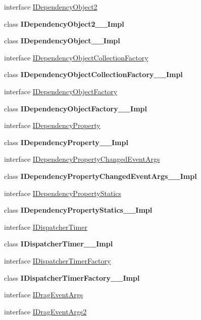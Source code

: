\begin{DoxyCompactItemize}
\item 
interface \hyperlink{interface_windows_1_1_u_i_1_1_xaml_1_1_i_dependency_object2}{I\+Dependency\+Object2}
\item 
class {\bfseries I\+Dependency\+Object2\+\_\+\+\_\+\+Impl}
\item 
class {\bfseries I\+Dependency\+Object\+\_\+\+\_\+\+Impl}
\item 
interface \hyperlink{interface_windows_1_1_u_i_1_1_xaml_1_1_i_dependency_object_collection_factory}{I\+Dependency\+Object\+Collection\+Factory}
\item 
class {\bfseries I\+Dependency\+Object\+Collection\+Factory\+\_\+\+\_\+\+Impl}
\item 
interface \hyperlink{interface_windows_1_1_u_i_1_1_xaml_1_1_i_dependency_object_factory}{I\+Dependency\+Object\+Factory}
\item 
class {\bfseries I\+Dependency\+Object\+Factory\+\_\+\+\_\+\+Impl}
\item 
interface \hyperlink{interface_windows_1_1_u_i_1_1_xaml_1_1_i_dependency_property}{I\+Dependency\+Property}
\item 
class {\bfseries I\+Dependency\+Property\+\_\+\+\_\+\+Impl}
\item 
interface \hyperlink{interface_windows_1_1_u_i_1_1_xaml_1_1_i_dependency_property_changed_event_args}{I\+Dependency\+Property\+Changed\+Event\+Args}
\item 
class {\bfseries I\+Dependency\+Property\+Changed\+Event\+Args\+\_\+\+\_\+\+Impl}
\item 
interface \hyperlink{interface_windows_1_1_u_i_1_1_xaml_1_1_i_dependency_property_statics}{I\+Dependency\+Property\+Statics}
\item 
class {\bfseries I\+Dependency\+Property\+Statics\+\_\+\+\_\+\+Impl}
\item 
interface \hyperlink{interface_windows_1_1_u_i_1_1_xaml_1_1_i_dispatcher_timer}{I\+Dispatcher\+Timer}
\item 
class {\bfseries I\+Dispatcher\+Timer\+\_\+\+\_\+\+Impl}
\item 
interface \hyperlink{interface_windows_1_1_u_i_1_1_xaml_1_1_i_dispatcher_timer_factory}{I\+Dispatcher\+Timer\+Factory}
\item 
class {\bfseries I\+Dispatcher\+Timer\+Factory\+\_\+\+\_\+\+Impl}
\item 
interface \hyperlink{interface_windows_1_1_u_i_1_1_xaml_1_1_i_drag_event_args}{I\+Drag\+Event\+Args}
\item 
interface \hyperlink{interface_windows_1_1_u_i_1_1_xaml_1_1_i_drag_event_args2}{I\+Drag\+Event\+Args2}

\end{DoxyCompactItemize}

